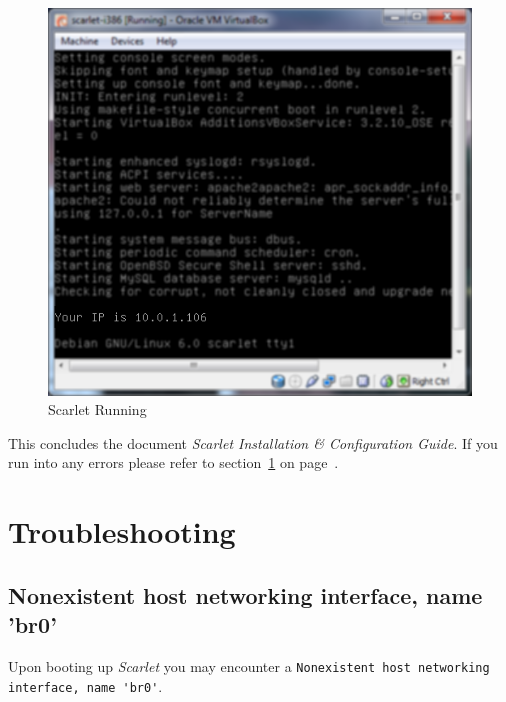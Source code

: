 \documentclass[pdftex,11pt,letterpaper]{article}
\begin{document}
\begin{enumerate}
    \begin{figure}[H]
        \begin{center}
        \leavevmode
            \includegraphics[]{scarlet_images/scarlet_running_blurred.png}
        \end{center}
        \caption{Scarlet Running}
        \label{fig:scarlet_running}
    \end{figure}

\end{enumerate}

This concludes the document \emph{Scarlet Installation \& Configuration Guide}.  If you run into any errors please refer to section~\ref{sec:troubleshooting} on page~\pageref{sec:troubleshooting}.

\section{Troubleshooting}
\label{sec:troubleshooting}

\subsection{Nonexistent host networking interface, name 'br0'}

Upon booting up \textit{Scarlet} you may encounter a \verb+Nonexistent host networking interface, name 'br0'+.
\end{document}
